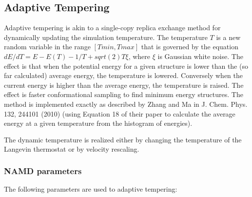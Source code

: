 \subsection{Adaptive Tempering}
\label{section:adapttemp}
Adaptive tempering is akin to a single-copy replica exchange method for dynamically updating the simulation temperature. The temperature $T$ is a new random variable in the range $[Tmin,Tmax]$ that is governed by the equation $dE/dT = E-E(T)-1/T+sqrt(2)T\xi$, where $\xi$ is Gaussian white noise. The effect is that when the potential energy for a given structure is lower than the (so far calculated) average energy, the temperature is lowered. Conversely when the current energy is higher than the average energy, the temperature is raised. The effect is faster conformational sampling to find minimum energy structures. The method is implemented exactly as described by Zhang and Ma in J. Chem. Phys. 132, 244101 (2010) (using Equation 18 of their paper to calculate the average energy at a given temperature from the histogram of energies). 

The dynamic temperature is realized either by changing the temperature of the Langevin thermostat or by velocity rescaling. 

\subsubsection{NAMD parameters}

The following parameters are used to adaptive tempering:

